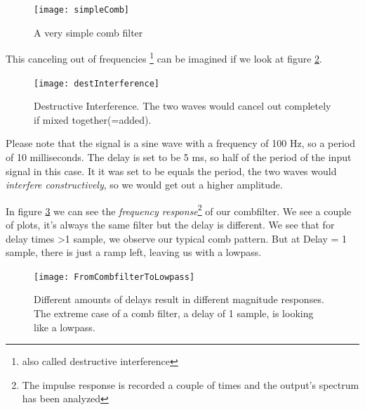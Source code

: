 \begin{figure}[H]
	\centering
	\texttt{[image: simpleComb]}
	\caption[simple comb filter]
	{A very simple comb filter}
	\label{fig:label}
\end{figure}

This canceling out of frequencies \footnote{also called destructive interference} can be imagined if we look at figure \ref{fig:destIntereference}.
\begin{figure}[H]
	\centering
	\texttt{[image: destInterference]}
	\caption[Destructive Interference]
	{Destructive Interference. The two waves would cancel out completely if mixed together(=added).}
	\label{fig:destIntereference}
\end{figure}

Please note that the signal is a sine wave with a frequency of 100 Hz, so a period of 10 milliseconds. The delay is set to be 5 ms, so half of the period of the input signal in this case. It it was set to be equals the period, the two waves would \textit{interfere constructively}, so we would get out a higher amplitude. \\


In figure \ref{fig:combToLowpass} we can see the \textit{frequency response}\footnote{The impulse response is recorded a couple of times and the output's spectrum has been analyzed} of our combfilter. We see a couple of plots, it's always the same filter but the delay is different. We see that for delay times >1 sample, we observe our typical comb pattern. But at Delay = 1 sample, there is just a ramp left, leaving us with a lowpass.

\begin{figure}[H]
	\centering
	\texttt{[image: FromCombfilterToLowpass]}
	\caption[From comb filter to lowpass]
	{Different amounts of delays result in different magnitude responses. The extreme case of a comb filter, a delay of 1 sample, is looking like a lowpass.}
	\label{fig:combToLowpass}
\end{figure}

